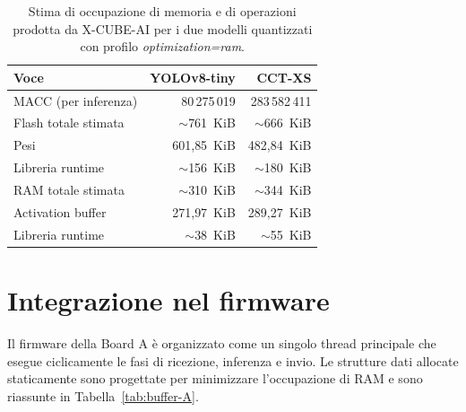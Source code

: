 \begin{table}[H]
    \centering
    \caption{Stima di occupazione di memoria e di operazioni prodotta da X-CUBE-AI per i due modelli quantizzati con profilo \textit{optimization=ram}.}
    \label{tab:cube-stats}
    \begin{tabular}{lrr}
        \toprule
        \textbf{Voce} & \textbf{YOLOv8-tiny} & \textbf{CCT-XS} \\
        \midrule
        MACC (per inferenza)             & 80\,275\,019 & 283\,582\,411 \\
        Flash totale stimata             & $\sim$761~KiB & $\sim$666~KiB \\
        \hspace{1em}Pesi                 & 601{,}85~KiB & 482{,}84~KiB \\
        \hspace{1em}Libreria runtime     & $\sim$156~KiB & $\sim$180~KiB \\
        RAM totale stimata               & $\sim$310~KiB & $\sim$344~KiB \\
        \hspace{1em}Activation buffer    & 271{,}97~KiB & 289{,}27~KiB \\
        \hspace{1em}Libreria runtime     & $\sim$38~KiB & $\sim$55~KiB \\
        \bottomrule
    \end{tabular}
\end{table}
 

\section{Integrazione nel firmware}
\label{sec:firmware-A}

Il firmware della Board A è organizzato come un singolo thread principale che esegue ciclicamente le fasi di ricezione, inferenza e invio. Le strutture dati allocate staticamente sono progettate per minimizzare l'occupazione di RAM e sono riassunte in Tabella~\ref{tab:buffer-A}.

